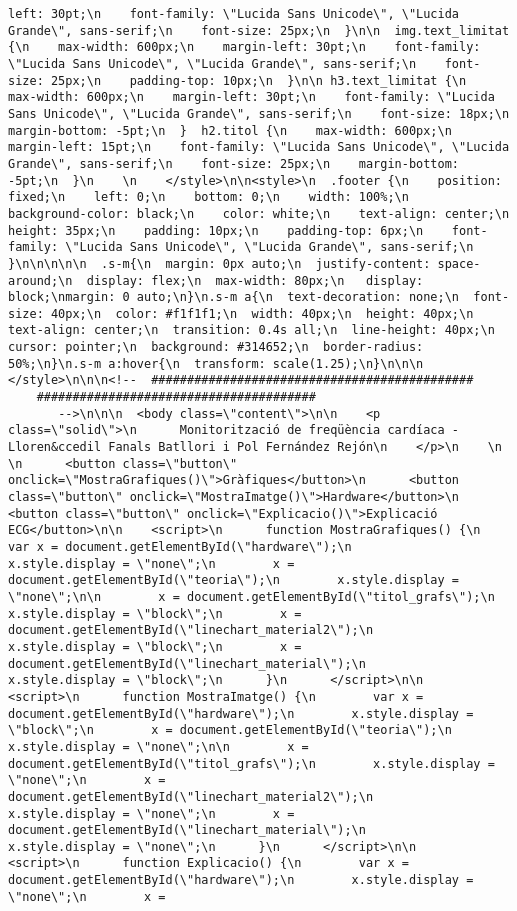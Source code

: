 \begin{lstlisting}[style=myArduino]
    left: 30pt;\n    font-family: \"Lucida Sans Unicode\", \"Lucida Grande\", sans-serif;\n    font-size: 25px;\n  }\n\n  img.text_limitat {\n    max-width: 600px;\n    margin-left: 30pt;\n    font-family: \"Lucida Sans Unicode\", \"Lucida Grande\", sans-serif;\n    font-size: 25px;\n    padding-top: 10px;\n  }\n\n h3.text_limitat {\n    max-width: 600px;\n    margin-left: 30pt;\n    font-family: \"Lucida Sans Unicode\", \"Lucida Grande\", sans-serif;\n    font-size: 18px;\n    margin-bottom: -5pt;\n  }  h2.titol {\n    max-width: 600px;\n    margin-left: 15pt;\n    font-family: \"Lucida Sans Unicode\", \"Lucida Grande\", sans-serif;\n    font-size: 25px;\n    margin-bottom: -5pt;\n  }\n    \n    </style>\n\n<style>\n  .footer {\n    position: fixed;\n    left: 0;\n    bottom: 0;\n    width: 100%;\n    background-color: black;\n    color: white;\n    text-align: center;\n    height: 35px;\n    padding: 10px;\n    padding-top: 6px;\n    font-family: \"Lucida Sans Unicode\", \"Lucida Grande\", sans-serif;\n  }\n\n\n\n\n  .s-m{\n  margin: 0px auto;\n  justify-content: space-around;\n  display: flex;\n  max-width: 80px;\n   display: block;\nmargin: 0 auto;\n}\n.s-m a{\n  text-decoration: none;\n  font-size: 40px;\n  color: #f1f1f1;\n  width: 40px;\n  height: 40px;\n  text-align: center;\n  transition: 0.4s all;\n  line-height: 40px;\n  cursor: pointer;\n  background: #314652;\n  border-radius: 50%;\n}\n.s-m a:hover{\n  transform: scale(1.25);\n}\n\n\n  </style>\n\n\n<!--  #############################################
    #######################################
       -->\n\n\n  <body class=\"content\">\n\n    <p class=\"solid\">\n      Monitorització de freqüència cardíaca - Lloren&ccedil Fanals Batllori i Pol Fernández Rejón\n    </p>\n    \n      \n      <button class=\"button\" onclick=\"MostraGrafiques()\">Gràfiques</button>\n      <button class=\"button\" onclick=\"MostraImatge()\">Hardware</button>\n      <button class=\"button\" onclick=\"Explicacio()\">Explicació ECG</button>\n\n    <script>\n      function MostraGrafiques() {\n        var x = document.getElementById(\"hardware\");\n        x.style.display = \"none\";\n        x = document.getElementById(\"teoria\");\n        x.style.display = \"none\";\n\n        x = document.getElementById(\"titol_grafs\");\n        x.style.display = \"block\";\n        x = document.getElementById(\"linechart_material2\");\n        x.style.display = \"block\";\n        x = document.getElementById(\"linechart_material\");\n        x.style.display = \"block\";\n      }\n      </script>\n\n    <script>\n      function MostraImatge() {\n        var x = document.getElementById(\"hardware\");\n        x.style.display = \"block\";\n        x = document.getElementById(\"teoria\");\n        x.style.display = \"none\";\n\n        x = document.getElementById(\"titol_grafs\");\n        x.style.display = \"none\";\n        x = document.getElementById(\"linechart_material2\");\n        x.style.display = \"none\";\n        x = document.getElementById(\"linechart_material\");\n        x.style.display = \"none\";\n      }\n      </script>\n\n    <script>\n      function Explicacio() {\n        var x = document.getElementById(\"hardware\");\n        x.style.display = \"none\";\n        x = 

\end{lstlisting}

